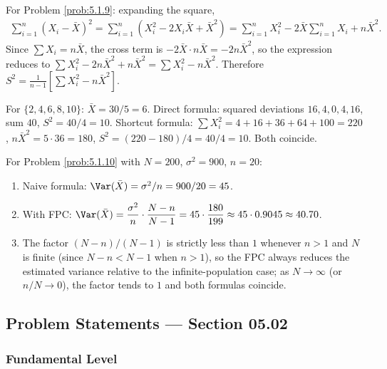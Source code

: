 \begin{solucion}
	\label{sol:5.1.9}
	For Problem \ref{prob:5.1.9}: expanding the square,
	\begin{align*}
		\sum_{i=1}^n(X_i-\bar X)^2 = \sum_{i=1}^n\left(X_i^2 - 2X_i\bar X + \bar X^2\right)
		= \sum_{i=1}^n X_i^2 - 2\bar X\sum_{i=1}^n X_i + n\bar X^2.
	\end{align*}
	Since $\sum X_i = n\bar X$, the cross term is $-2\bar X\cdot n\bar X = -2n\bar X^2$, so the expression reduces to $\sum X_i^2 - 2n\bar X^2 + n\bar X^2 = \sum X_i^2 - n\bar X^2$. Therefore $S^2 = \frac{1}{n-1}\left[\sum X_i^2 - n\bar X^2\right]$.

	For $\{2,4,6,8,10\}$: $\bar X = 30/5=6$. Direct formula: squared deviations $16,4,0,4,16$, sum $40$, $S^2=40/4=10$. Shortcut formula: $\sum X_i^2 = 4+16+36+64+100=220$, $n\bar X^2 = 5\cdot 36=180$, $S^2=(220-180)/4=40/4=10$. Both coincide. \quad \qedhere
\end{solucion}

\begin{solucion}
	\label{sol:5.1.10}
	For Problem \ref{prob:5.1.10} with $N=200$, $\sigma^2=900$, $n=20$:
	\begin{enumerate}
		\item Naive formula: $\Var(\bar X) = \sigma^2/n = 900/20 = 45$.
		\item With FPC: $\Var(\bar X) = \dfrac{\sigma^2}{n}\cdot\dfrac{N-n}{N-1} = 45\cdot\dfrac{180}{199} \approx 45\cdot 0.9045 \approx 40.70$.
		\item The factor $(N-n)/(N-1)$ is strictly less than $1$ whenever $n>1$ and $N$ is finite (since $N-n<N-1$ when $n>1$), so the FPC always reduces the estimated variance relative to the infinite-population case; as $N\to\infty$ (or $n/N\to 0$), the factor tends to $1$ and both formulas coincide. \quad \qedhere
	\end{enumerate}
\end{solucion}


\subsection*{Problem Statements --- Section 05.02}

\subsubsection*{Fundamental Level}

